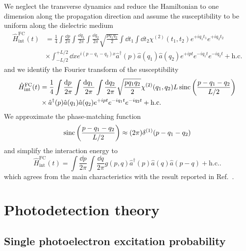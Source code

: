 We neglect the transverse dynamics and reduce the Hamiltonian to one dimension along the propagation direction and assume the susceptibility to be uniform along the dielectric medium
\begin{equation}
	\begin{split}
		\hat{H}_\text{int}^\text{FC}(t)
		&=
		\frac{1}{4}
		\int\frac{\dd{p}}{2\pi}
		\int\frac{\dd{q_1}}{2\pi}
		\int\frac{\dd{q_2}}{2\pi}
		\sqrt{\frac{pq_1q_2}{2}}
		\int\dd{t_1}
		\int\dd{t_2}
		\chi^{(2)}(t_1,t_2)
		e^{+iq_1t_1}
		e^{+iq_2t_2}
		\\
		&\times
		\int_{-L/2}^{+L/2}\dd{x}
		e^{i(p-q_1-q_2)x}
		\hat{a}^\dagger(p)
		\hat{a}(q_1)
		\hat{a}(q_2)
		e^{+ipt}
		e^{-iq_1t}
		e^{-iq_2t}
		+
		\text{h.c.}
	\end{split}
\end{equation}
and we identify the Fourier transform of the susceptibility
\begin{equation}
	\begin{split}
		\hat{H}_\text{int}^\text{FC}(t)
		&=
		\frac{1}{4}
		\int\frac{\dd{p}}{2\pi}
		\int\frac{\dd{q_1}}{2\pi}
		\int\frac{\dd{q_2}}{2\pi}
		\sqrt{\frac{pq_1q_2}{2}}
		\chi^{(2)}(q_1,q_2)L
		\sinc\left(\frac{p-q_1-q_2}{L/2}\right)
		\\
		&\times
		\hat{a}^\dagger(p)
		\hat{a}(q_1)
		\hat{a}(q_2)
		e^{+ipt}
		e^{-iq_1t}
		e^{-iq_2t}
		+
		\text{h.c.}
	\end{split}
\end{equation}
We approximate the phase-matching function
\begin{equation}
	\operatorname{sinc}\left(\frac{p-q_1-q_2}{L/2}\right)
	\approx
	(2\pi)
	\delta^{(1)}(p-q_1-q_2)
\end{equation}
and simplify the interaction energy to
\begin{equation}
	\hat{H}_\text{int}^\text{FC}(t)
	=
	\int\frac{\dd{p}}{2\pi}
	\int\frac{\dd{q}}{2\pi}
	g(p,q)
	\hat{a}^\dagger(p)
	\hat{a}(q)
	\hat{a}(p-q)
	+
	\text{h.c.}
	.
\end{equation}
which agrees from the main characteristics with the result reported in Ref.~\cite[eq.~35]{Horoshko2018}.

\section{Photodetection theory}

\subsection{Single photoelectron excitation probability}

